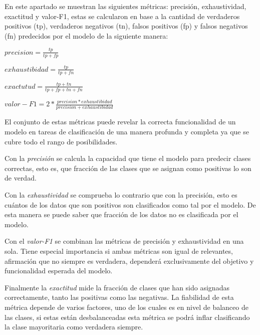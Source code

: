 En este apartado se muestran las siguientes métricas: precisión, exhaustividad,
exactitud y valor-F1, estas se calcularon en base a la cantidad de verdaderos
positivos (tp), verdaderos negativos (tn), falsos positivos (fp) y falsos
negativos (fn) predecidos por el modelo de la siguiente manera: 

\begin{center}
    $precision=\frac{tp}{tp + fp}$

    $exhaustibidad=\frac{tp}{tp + fn}$

    $exactutud=\frac{tp+tn}{tp + fp + tn + fn}$

    $valor-F1=2*\frac{precision * exhaustibidad}{precision + exhaustibidad}$
\end{center}

El conjunto de estas métricas puede revelar la correcta funcionalidad de un
modelo en tareas de clasificación de una manera profunda y completa ya que se
cubre todo el rango de posibilidades. 

Con la \textit{precisión} se calcula la capacidad que tiene el modelo para
predecir clases correctas, esto es, que fracción de las clases que se asignan
como positivas lo son de verdad. 

Con la \textit{exhaustividad} se comprueba lo contrario que con la precisión,
esto es cuántos de los datos que son positivos son clasificados como tal por el
modelo. De esta manera se puede saber que fracción de los datos no es
clasificada por el modelo.

Con el \textit{valor-F1} se combinan las métricas de precisión y exhaustividad
en una sola. Tiene especial importancia si ambas métricas son igual de
relevantes, afirmación que no siempre es verdadera, dependerá exclusivamente del
objetivo y funcionalidad esperada del modelo. 

Finalmente la \textit{exactitud} mide la fracción de clases que han sido
asignadas correctamente, tanto las positivas como las negativas. La fiabilidad
de esta métrica depende de varios factores, uno de los cuales es en nivel de
balanceo de las clases, si estas están desbalanceadas esta métrica se podrá
inflar clasificando la clase mayoritaria como verdadera siempre. 

